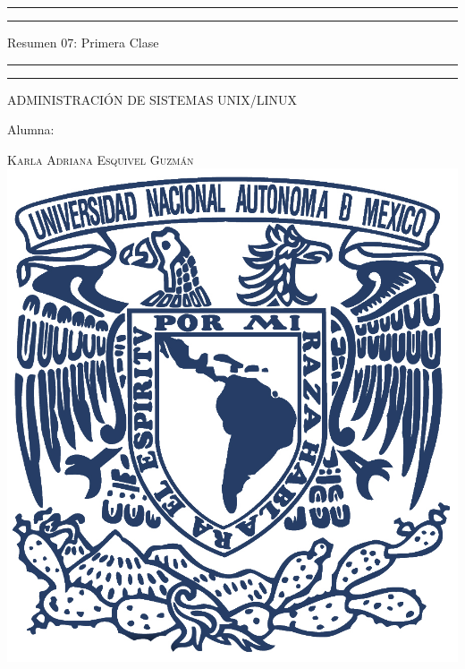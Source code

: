 \documentclass[a4paper, 11pt, oneside]{article}
\begin{document}
 

\begin{titlepage} 

	\centering 
	
	\scshape 
	
	\vspace*{\baselineskip} 
	
	
	
	\rule{\textwidth}{1.6pt}\vspace*{-\baselineskip}\vspace*{2pt} 
	\rule{\textwidth}{0.4pt} 
	
	\vspace{0.75\baselineskip} 
	
	{\LARGE Resumen 07: Primera Clase}	
	\vspace{0.75\baselineskip} 
	
	\rule{\textwidth}{0.4pt}\vspace*{-\baselineskip}\vspace{3.2pt}
	\rule{\textwidth}{1.6pt} 
	
	\vspace{2\baselineskip} 
	

	ADMINISTRACIÓN DE SISTEMAS UNIX/LINUX
	
	\vspace*{3\baselineskip} 
	
	
	
	Alumna:
	
	\vspace{0.5\baselineskip} 
	
	{\scshape\Large Karla Adriana Esquivel Guzmán \\} 
	\vspace{0.5\baselineskip} 
	\vfill
	\includegraphics{unam.jpg}
	

\end{titlepage}
\end{document}
